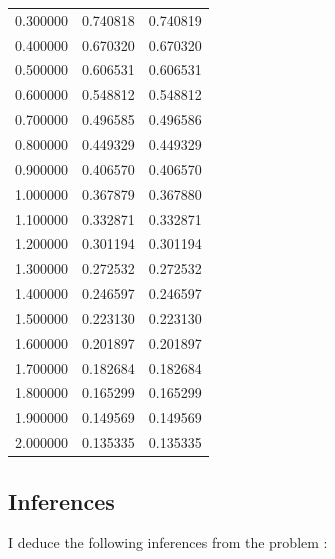 \documentclass[titlepage, 11pt]{article}
\begin{document}
\begin{itemize}
\begin{table}[!htb]
\begin{tabular}{c|c|c}
0.300000 &	0.740818 &	0.740819 \\
0.400000 &	0.670320 &	0.670320 \\
0.500000 &	0.606531 &	0.606531  \\
0.600000 &	0.548812 &	0.548812 \\
0.700000 &	0.496585 &	0.496586 \\
0.800000 &	0.449329 &	0.449329 \\
0.900000 &	0.406570 &	0.406570 \\
1.000000 &	0.367879 &	0.367880 \\
1.100000 &	0.332871 &	0.332871 \\
1.200000 &	0.301194 &	0.301194 \\
1.300000 &	0.272532 &	0.272532 \\
1.400000 &	0.246597 &	0.246597 \\
1.500000 &	0.223130 &	0.223130 \\
1.600000 &	0.201897 &	0.201897 \\
1.700000 &	0.182684 &	0.182684 \\
1.800000 &	0.165299 &	0.165299 \\
1.900000 &	0.149569 &	0.149569 \\
2.000000 &	0.135335 & 0.135335 \\
    \bottomrule
    \end{tabular}
    \label{tab:tabie}
\end{table}
\end{itemize}


\subsection{Inferences}
I deduce the following inferences from the problem :
\end{document}
